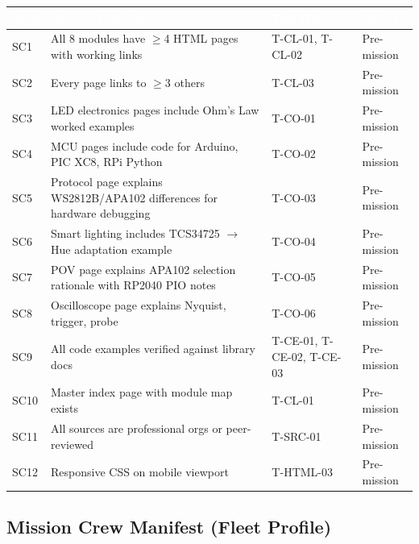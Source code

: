 \documentclass[11pt,letterpaper]{article}
\newcommand{\tableheader}[1]{\textbf{\sffamily\textcolor{white}{#1}}}
\begin{document}
\begin{center}
\begin{tabularx}{\textwidth}{L{1cm}L{4.5cm}L{3cm}L{2cm}}
\toprule
{}
\tableheader{SC\#} & \tableheader{Success Criterion} & \tableheader{Test IDs} & \tableheader{Status} \\
\midrule
SC1 & All 8 modules have $\geq$4 HTML pages with working links & T-CL-01, T-CL-02 & Pre-mission \\
SC2 & Every page links to $\geq$3 others & T-CL-03 & Pre-mission \\
SC3 & LED electronics pages include Ohm's Law worked examples & T-CO-01 & Pre-mission \\
SC4 & MCU pages include code for Arduino, PIC XC8, RPi Python & T-CO-02 & Pre-mission \\
SC5 & Protocol page explains WS2812B/APA102 differences for hardware debugging & T-CO-03 & Pre-mission \\
SC6 & Smart lighting includes TCS34725 $\rightarrow$ Hue adaptation example & T-CO-04 & Pre-mission \\
SC7 & POV page explains APA102 selection rationale with RP2040 PIO notes & T-CO-05 & Pre-mission \\
SC8 & Oscilloscope page explains Nyquist, trigger, probe & T-CO-06 & Pre-mission \\
SC9 & All code examples verified against library docs & T-CE-01, T-CE-02, T-CE-03 & Pre-mission \\
SC10 & Master index page with module map exists & T-CL-01 & Pre-mission \\
SC11 & All sources are professional orgs or peer-reviewed & T-SRC-01 & Pre-mission \\
SC12 & Responsive CSS on mobile viewport & T-HTML-03 & Pre-mission \\
\bottomrule
\end{tabularx}
\end{center}

\subsection{Mission Crew Manifest (Fleet Profile)}
\end{document}
